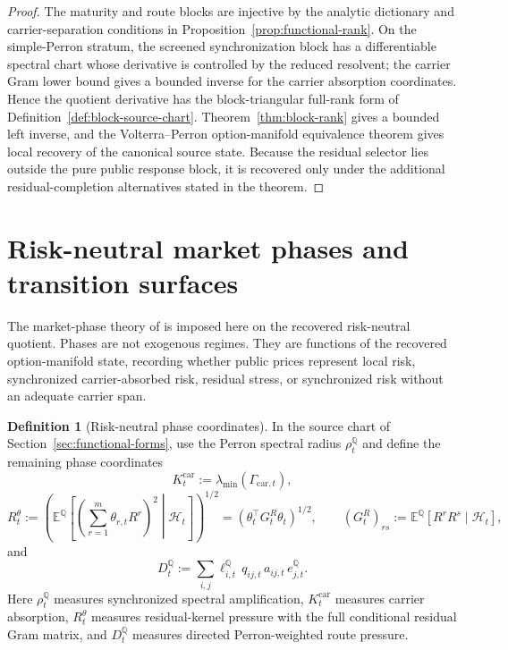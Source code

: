 \documentclass[11pt,a4paper]{amsart}
\theoremstyle{plain}
\theoremstyle{definition}
\newtheorem{definition}[theorem]{Definition}
\theoremstyle{remark}
\newcommand{\QQ}{\mathbb{Q}}
\newcommand{\EE}{\mathbb{E}}
\newcommand{\cH}{\mathcal{H}}
\begin{document}
\begin{proof}
The maturity and route blocks are injective by the analytic dictionary and carrier-separation
conditions in Proposition~\ref{prop:functional-rank}.  On the simple-Perron stratum, the screened
synchronization block has a differentiable spectral chart whose derivative is controlled by the
reduced resolvent; the carrier Gram lower bound gives a bounded inverse for the carrier absorption
coordinates.  Hence the quotient derivative has the block-triangular full-rank form of
Definition~\ref{def:block-source-chart}.  Theorem~\ref{thm:block-rank} gives a bounded left
inverse, and the Volterra--Perron option-manifold equivalence theorem gives local recovery of the
canonical source state.  Because the residual selector lies outside the pure public response block, it is recovered only under
the additional residual-completion alternatives stated in the theorem.
\end{proof}

\section{Risk-neutral market phases and transition surfaces}\label{sec:phases}

The market-phase theory of \cite{vidal2026market} is imposed here on the recovered risk-neutral
quotient.  Phases are not exogenous regimes.  They are functions of the recovered option-manifold
state, recording whether public prices represent local risk, synchronized carrier-absorbed risk,
residual stress, or synchronized risk without an adequate carrier span.

\begin{definition}[Risk-neutral phase coordinates]\label{def:phase-coordinates}
In the source chart of Section~\ref{sec:functional-forms}, use the Perron spectral radius
\(\rho_t^\QQ\) and define the remaining phase coordinates
\[
        K_t^{\mathrm{car}}:=\lambda_{\min}(\Gamma_{\mathrm{car},t}),
\]
\[
        R_t^\theta
        :=
        \left(
        \EE^\QQ\!\left[
        \left(\sum_{r=1}^m\theta_{r,t}R^r\right)^2
        \middle|\cH_t\right]
        \right)^{1/2}
        =
        \left(\theta_t^\top G_t^R\theta_t\right)^{1/2},
        \qquad
        (G_t^R)_{rs}:=\EE^\QQ[R^rR^s\mid\cH_t],
\]
and
\[
        D_t^\QQ
        :=
        \sum_{i,j}
        \ell_{i,t}^\QQ\,q_{ij,t}\,
        a_{ij,t}\,
        e_{j,t}^\QQ .
\]
Here \(\rho_t^\QQ\) measures synchronized spectral amplification, \(K_t^{\mathrm{car}}\)
measures carrier absorption, \(R_t^\theta\) measures residual-kernel pressure with the full
conditional residual Gram matrix, and
\(D_t^\QQ\) measures directed Perron-weighted route pressure.
\end{definition}
\end{document}
